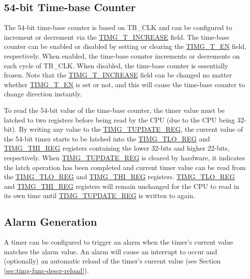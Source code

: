 \documentclass[main\_\_EN.tex]{subfiles}
\begin{document}
\subsection{54-bit Time-base Counter}
The 54-bit time-base counter is based on TB\_CLK and can be configured to increment or decrement via the \hyperref[fielddesc:TIMGTXINCREASE]{TIMG\_T\_INCREASE} field. The time-base counter can be enabled or disabled by setting or clearing the \hyperref[fielddesc:TIMGTXEN]{TIMG\_T\_EN} field, respectively. When enabled, the time-base counter increments or decrements on each cycle of TB\_CLK. When disabled, the time-base counter is essentially frozen. Note that the \hyperref[fielddesc:TIMGTXINCREASE]{TIMG\_T\_INCREASE} field can be changed no matter whether \hyperref[fielddesc:TIMGTXEN]{TIMG\_T\_EN} is set or not, and this will cause the time-base counter to change direction instantly.

To read the 54-bit value of the time-base counter, the timer value must be latched to two registers before being read by the CPU (due to the CPU being 32-bit). By writing any value to the \hyperref[regdesc:TIMGTXUPDATEREG]{TIMG\_TUPDATE\_REG}, the current value of the 54-bit timer starts to be latched into the \hyperref[regdesc:TIMGTXLOREG]{TIMG\_TLO\_REG} and \hyperref[regdesc:TIMGTXHIREG]{TIMG\_THI\_REG} registers containing the lower 32-bits and higher 22-bits, respectively. When \hyperref[regdesc:TIMGTXUPDATEREG]{TIMG\_TUPDATE\_REG} is cleared by hardware, it indicates the latch operation has been completed and current timer value can be read from the \hyperref[regdesc:TIMGTXLOREG]{TIMG\_TLO\_REG} and \hyperref[regdesc:TIMGTXHIREG]{TIMG\_THI\_REG} registers. \hyperref[regdesc:TIMGTXLOREG]{TIMG\_TLO\_REG} and \hyperref[regdesc:TIMGTXHIREG]{TIMG\_THI\_REG} registers will remain unchanged for the CPU to read in its own time until \hyperref[regdesc:TIMGTXUPDATEREG]{TIMG\_TUPDATE\_REG} is written to again.

\subsection{Alarm Generation}
A timer can be configured to trigger an alarm when the timer's current value matches the alarm value. An alarm will cause an interrupt to occur and (optionally) an automatic reload of the timer's current value (see Section \ref{sec:timg-func-descr-reload}).
\end{document}
